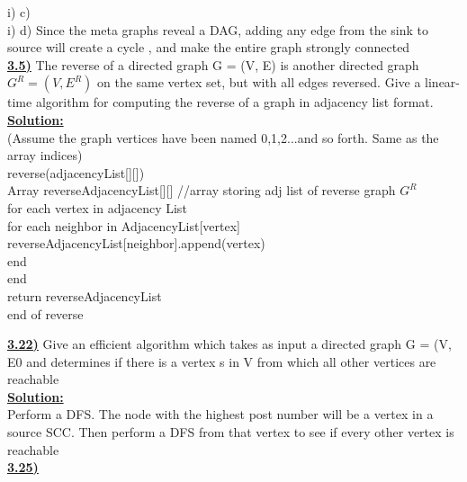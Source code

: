 \documentclass{article}
\begin{document}
\noindent i) c) \\

\noindent i) d) Since the meta graphs reveal a DAG, adding any edge from the sink to source will create a cycle , and make the entire graph strongly connected \\

\vspace{.2in}
\noindent \textbf{\underline{3.5)}} The reverse of a directed graph G = (V, E) is another directed graph $G^R = (V, E^R)$ on the same vertex set, but with all edges reversed. Give a linear-time algorithm for computing the reverse of a graph in adjacency list format. \\

\noindent \textbf{\underline{Solution:}}  \\
\noindent *(Assume the graph vertices have been named 0,1,2...and so forth. Same as the array indices) \\

\noindent reverse(adjacencyList[][]) \\
\indent Array reverseAdjacencyList[][] //array storing adj list of reverse graph $G^R$ \\
\indent for each vertex in adjacency List \\
\indent \indent for each neighbor in AdjacencyList[vertex] \\
\indent \indent \indent reverseAdjacencyList[neighbor].append(vertex) \\
\indent \indent end \\
\indent end \\
\indent return reverseAdjacencyList \\
\noindent end of reverse

\vspace{.2in}
\noindent \textbf{\underline{3.22)}} Give an efficient algorithm which takes as input a directed graph G = (V, E0 and determines if there is a vertex s in V from which all other vertices are reachable \\

\noindent \textbf{\underline{Solution:}}  \\
Perform a DFS. The node with the highest post number will be a vertex in a source SCC. Then perform a DFS from that vertex to see if every other vertex is reachable \\ 

\vspace{.2in}
\noindent \textbf{\underline{3.25)}} \\
\end{document}
